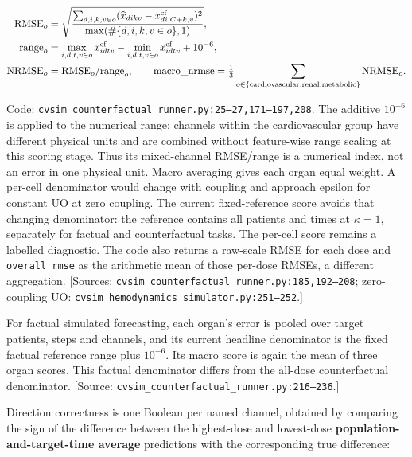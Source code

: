 \[
\begin{aligned}
\mathrm{RMSE}_o&=\sqrt{\frac{\sum_{d,i,k,v\in o}(\widehat x_{dikv}-x^{\rm cf}_{di,C+k,v})^2}
 {\max(\#\{d,i,k,v\in o\},1)}},\\
\mathrm{range}_o&=\max_{i,d,t,v\in o}x^{\rm cf}_{idtv}-\min_{i,d,t,v\in o}x^{\rm cf}_{idtv}+10^{-6},\\
\mathrm{NRMSE}_o&=\mathrm{RMSE}_o/\mathrm{range}_o,\qquad
\mathrm{macro\_nrmse}=\tfrac13\sum_{o\in\{\mathrm{cardiovascular,renal,metabolic}\}}\mathrm{NRMSE}_o.
\end{aligned}
\]


Code: \texttt{cvsim\_\allowbreak{}counterfactual\_\allowbreak{}runner.\allowbreak{}py:\allowbreak{}25–\allowbreak{}27,\allowbreak{}171–\allowbreak{}197,\allowbreak{}208}. The additive \(10^{-6}\) is applied to the numerical range; channels within the cardiovascular group have different physical units and are combined without feature-wise range scaling at this scoring stage. Thus its mixed-channel RMSE/range is a numerical index, not an error in one physical unit. Macro averaging gives each organ equal weight. A per-cell denominator would change with coupling and approach epsilon for constant UO at zero coupling. The current fixed-reference score avoids that changing denominator: the reference contains all patients and times at $\kappa=1$, separately for factual and counterfactual tasks. The per-cell score remains a labelled diagnostic. The code also returns a raw-scale RMSE for each dose and \texttt{overall\_\allowbreak{}rmse} as the arithmetic mean of those per-dose RMSEs, a different aggregation. [Sources: \texttt{cvsim\_\allowbreak{}counterfactual\_\allowbreak{}runner.\allowbreak{}py:\allowbreak{}185,\allowbreak{}192–\allowbreak{}208}; zero-coupling UO: \texttt{cvsim\_\allowbreak{}hemodynamics\_\allowbreak{}simulator.\allowbreak{}py:\allowbreak{}251–\allowbreak{}252}.]

For factual simulated forecasting, each organ's error is pooled over target patients, steps and channels, and its current headline denominator is the fixed factual reference range plus \(10^{-6}\). Its macro score is again the mean of three organ scores. This factual denominator differs from the all-dose counterfactual denominator. [Source: \texttt{cvsim\_\allowbreak{}counterfactual\_\allowbreak{}runner.\allowbreak{}py:\allowbreak{}216–\allowbreak{}236}.]

Direction correctness is one Boolean per named channel, obtained by comparing the sign of the difference between the highest-dose and lowest-dose \textbf{population-and-target-time average} predictions with the corresponding true difference:

